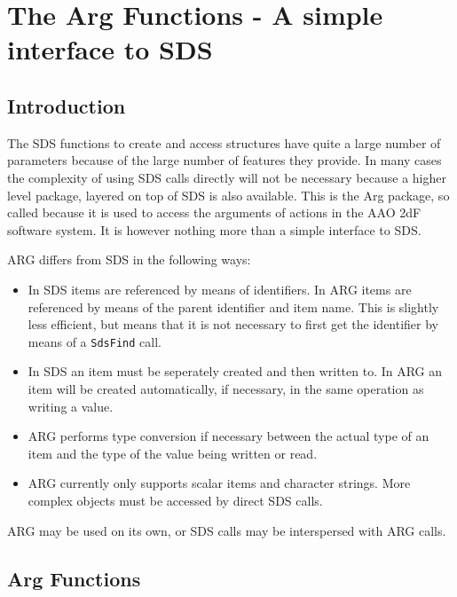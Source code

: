 \section{The Arg Functions - A simple interface to SDS}

\subsection{Introduction}

The SDS functions to create and access structures have quite a large number of
parameters because of the large number of features they provide. In many cases
the complexity of using SDS calls directly will not be necessary because a
higher level package, layered on top of SDS is also available. This is the Arg
package, so called because it is used to access the arguments of actions in the
AAO 2dF software system. It is however nothing more than a simple interface to
SDS.

ARG differs from SDS in the following ways:

\begin{itemize}

\item In SDS items are referenced by means of identifiers. In ARG items are
referenced by means of the parent identifier and item name. This is slightly
less efficient, but means that it is not necessary to first get the identifier
by means of a \verb$SdsFind$ call.

\item In SDS an item must be seperately created and then written to. In ARG
an item will be created automatically, if necessary, in the same operation as
writing a value.

\item ARG performs type conversion if necessary between the actual type of an
item and the type of the value being written or read.

\item ARG currently only supports scalar items and character strings. More 
complex objects must be accessed by direct SDS calls.

\end{itemize}

ARG may be used on its own, or SDS calls may be interspersed with ARG calls.


\subsection{Arg Functions}

